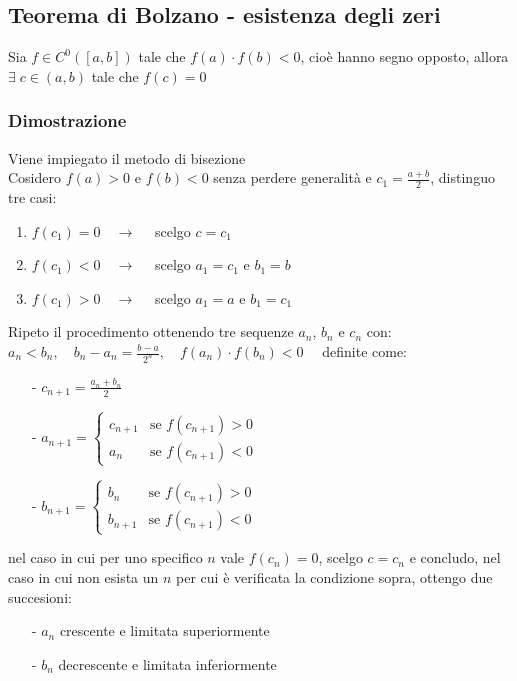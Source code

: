 \documentclass[a4paper]{article}
\newcommand\cont[2]{C^{#1} \left({#2}\right)}
\begin{document}
\subsection{Teorema di Bolzano - esistenza degli zeri}
Sia \(f \in \cont{0}{\left[a, b\right]}\) tale che \(f(a) \cdot f(b) < 0\), cioè hanno segno opposto, allora \(\exists \; c \in \left(a, b\right)\)
tale che \(f(c) = 0\)

\subsubsection*{Dimostrazione}
Viene impiegato il metodo di bisezione \\
Cosidero \(f(a) > 0\) e \(f(b) < 0\) senza perdere generalità e \(\displaystyle c_1 = \frac{a + b}{2}\), distinguo tre casi:
\begin{enumerate} [topsep=3pt, itemsep=0pt]
	\item \(f(c_1) = 0 \quad \rightarrow \quad\) scelgo \(c = c_1\)
	\item \(f(c_1) < 0 \quad \rightarrow \quad\) scelgo \(a_1 = c_1\) e \(b_1 = b\)
	\item \(f(c_1) > 0 \quad \rightarrow \quad\) scelgo \(a_1 = a\) e \(b_1 = c_1\)
\end{enumerate}
Ripeto il procedimento ottenendo tre sequenze \(a_n\), \(b_n\) e \(c_n\) con: \\
\(a_n < b_n, \quad b_n - a_n = \frac{b-a}{2^n}, \quad f(a_n) \cdot f(b_n) < 0 \quad\) definite come:
\begin{itemize} [topsep=3pt, itemsep=0pt]
	\item[-] \(c_{n+1} = \frac{a_n + b_n}{2}\)
	\item[-] \(a_{n+1} = \begin{cases}
		c_{n+1} &\text{se } f(c_{n+1}) > 0 \\
		a_n & \text{se } f(c_{n+1}) < 0
	\end{cases}\)
	\item[-] \(b_{n+1} = \begin{cases}
		b_n &\text{se } f(c_{n+1}) > 0 \\
		b_{n+1} & \text{se } f(c_{n+1}) < 0
	\end{cases}\)
\end{itemize}
nel caso in cui per uno specifico \(n\) vale \(f(c_n) = 0\), scelgo \(c = c_n\) e concludo, nel caso in cui non esista un \(n\)
per cui è verificata la condizione sopra, ottengo due succesioni:
\begin{itemize} [topsep=3pt, itemsep=0pt]
	\item[-] \(a_n\) crescente e limitata superiormente
	\item[-] \(b_n\) decrescente e limitata inferiormente
\end{itemize}
\end{document}
